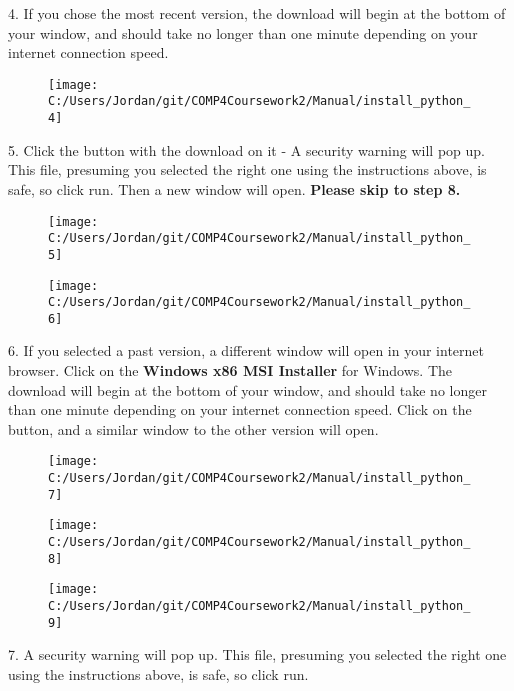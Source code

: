 4. If you chose the most recent version, the download will begin at the bottom of your window, and should take no longer than one minute depending on your internet connection speed.

\begin{figure}[H]
    \texttt{[image: C:/Users/Jordan/git/COMP4Coursework2/Manual/install\_python\_4]}
\end{figure}

5. Click the button with the download on it - A security warning will pop up. This file, presuming you selected the right one using the instructions above, is safe, so click run. Then a new window will open. \textbf{Please skip to step 8.}

\begin{figure}[H]
    \texttt{[image: C:/Users/Jordan/git/COMP4Coursework2/Manual/install\_python\_5]}
\end{figure}

\begin{figure}[H]
    \texttt{[image: C:/Users/Jordan/git/COMP4Coursework2/Manual/install\_python\_6]}
\end{figure}

6. If you selected a past version, a different window will open in your internet browser. Click on the \textbf{Windows x86 MSI Installer} for Windows. The download will begin at the bottom of your window, and should take no longer than one minute depending on your internet connection speed. Click on the button, and a similar window to the other version will open.

\begin{figure}[H]
    \texttt{[image: C:/Users/Jordan/git/COMP4Coursework2/Manual/install\_python\_7]}
\end{figure}

\begin{figure}[H]
    \texttt{[image: C:/Users/Jordan/git/COMP4Coursework2/Manual/install\_python\_8]}
\end{figure}

\begin{figure}[H]
    \texttt{[image: C:/Users/Jordan/git/COMP4Coursework2/Manual/install\_python\_9]}
\end{figure}

7. A security warning will pop up. This file, presuming you selected the right one using the instructions above, is safe, so click run.

